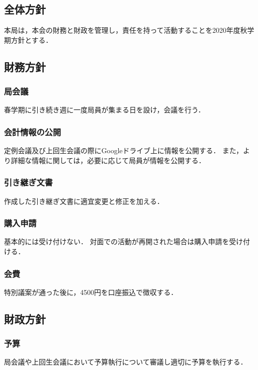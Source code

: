 \subsection*{全体方針}



本局は，本会の財務と財政を管理し，責任を持って活動することを2020年度秋学期方針とする．


\subsection*{財務方針}

\subsubsection*{局会議}
春学期に引き続き週に一度局員が集まる日を設け，会議を行う．

\subsubsection*{会計情報の公開}
定例会議及び上回生会議の際にGoogleドライブ上に情報を公開する．
また，より詳細な情報に関しては，必要に応じて局員が情報を公開する．

\subsubsection*{引き継ぎ文書}
作成した引き継ぎ文書に適宜変更と修正を加える．

\subsubsection*{購入申請}
基本的には受け付けない．
対面での活動が再開された場合は購入申請を受け付ける．

\subsubsection*{会費}
特別議案が通った後に，4500円を口座振込で徴収する．


\subsection*{財政方針}

\subsubsection*{予算}
局会議や上回生会議において予算執行について審議し適切に予算を執行する．

